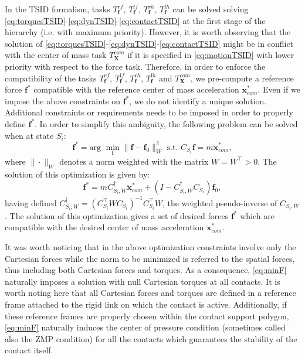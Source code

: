 \documentclass[12pt,a4paper,twoside]{article}
\begin{document}
In the TSID formalism, tasks $T^{rf}_{\bm f}$, $T^{lf}_{\bm f}$, $T^{rh}_{\bm f}$, $T^{lh}_{\bm f}$ can be solved solving \eqref{eq:torquesTSID}-\eqref{eq:dynTSID}-\eqref{eq:contactTSID} at the first stage of the hierarchy (i.e. with maximum priority). However, it is worth observing that the solution of \eqref{eq:torquesTSID}-\eqref{eq:dynTSID}-\eqref{eq:contactTSID} might be in conflict with the center of mass task $T^{com}_{\bm X}$ if it is specified in \eqref{eq:motionTSID} with lower priority with respect to the force task. Therefore, in order to enforce the compatibility of the tasks $T^{rf}_{\bm f}$, $T^{lf}_{\bm f}$, $T^{rh}_{\bm f}$, $T^{lh}_{\bm f}$ and $T^{com}_{\bm X}$, we pre-compute a  reference force $\bm f^*$ compatible with the reference center of mass acceleration $\bm x_{com}^*$. Even if we impose the above constraints on $\bm f^*$, we do not identify a unique solution. Additional constraints or requirements needs to be imposed in order to properly define $\bm f^*$. In order to simplify this ambiguity, the following problem can be solved when at state $S_i$:
\begin{equation} \label{eq:minF}
\bm f^* = \mbox{arg } \min_{\bm f} \| \bm f - \bm f_0 \|^2_W  \mbox{ s.t. } C_{S_i} \bm f= m \ddot {{\bm x}}^*_{com},
\end{equation}
where $\| \cdot \|_W$ denotes a norm weighted with the matrix $W = W^\top >0$. The solution of this optimization is given by:
\begin{equation} 
\bm f^* = m  C_{S_i, W}^\dagger \ddot {{\bm x}}_{com}^*+ (I - C_{S_i, W}^\dagger C_{S_i}) \bm f_0,
\end{equation}
having defined $C_{S_i, W}^\dagger  = \left( C_{S_i}^\top W C_{S_i} \right)^{-1} C_{S_i}^\top W$, the weighted pseudo-inverse of $C_{S_i, W}$. The solution of this optimization gives a set of desired forces $\bm f^*$ which are compatible with the desired center of mass acceleration $\ddot {\bm x}^*_{com} $. 

It was worth noticing that in the above optimization constraints involve only the Cartesian forces while the norm to be minimized is referred to the spatial forces, thus including both Cartesian forces and torques. As a consequence, \eqref{eq:minF} naturally imposes a solution with null Cartesian torques at all contacts. It is worth noting here that all Cartesian forces and torques are defined in a reference frame attached to the rigid link on which the contact is active. Additionally, if these reference frames are properly chosen within the contact support polygon, \eqref{eq:minF} naturally induces the center of pressure condition (sometimes called also the ZMP condition) for all the contacts which guarantees the stability of the contact itself.  
\end{document}
